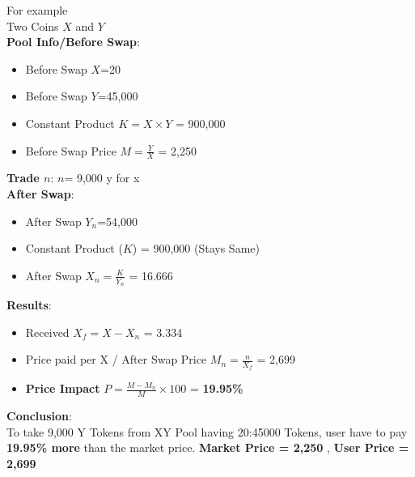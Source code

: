 \documentclass[10pt]{article}
\begin{document}
For example\\

Two Coins $X$ and $Y$\\


\textbf{Pool Info/Before Swap}:
\begin{itemize}[leftmargin=+0.2in]
\item Before Swap $X$=20
\item Before Swap $Y$=45,000
\item Constant Product $K=X \times  Y$ = 900,000 
\item Before Swap Price $M=\frac{Y}{X}$ = 2,250 
\end{itemize}

\textbf{Trade $n$}: $n$= 9,000 y for x\\

\textbf{After Swap}:
\begin{itemize}[leftmargin=+0.2in]
\item After Swap $Y_n$=54,000 
\item Constant Product ($K$) = 900,000 (Stays Same)
\item After Swap $X_n=\frac{K}{Y_n}$ = 16.666  
\end{itemize}
\textbf{Results}:
\begin{itemize}[leftmargin=+0.2in]
\item Received $X_f={{X}-{X_n}}$ = 3.334 
\item Price paid per X / After Swap Price $M_n={\frac{n}{X_f}}$  = 2,699  
\item \textbf{Price Impact} $P={\frac{M - M_n}{M} \times  100}$ = \textbf{19.95\% }
\end{itemize}


\textbf{Conclusion}:\\

To take 9,000 Y Tokens from XY Pool having 20:45000 Tokens, user have to pay \textbf{19.95\% more} than the market price. \textbf{Market Price = 2,250} , \textbf{User Price = 2,699}\\
\end{document}
